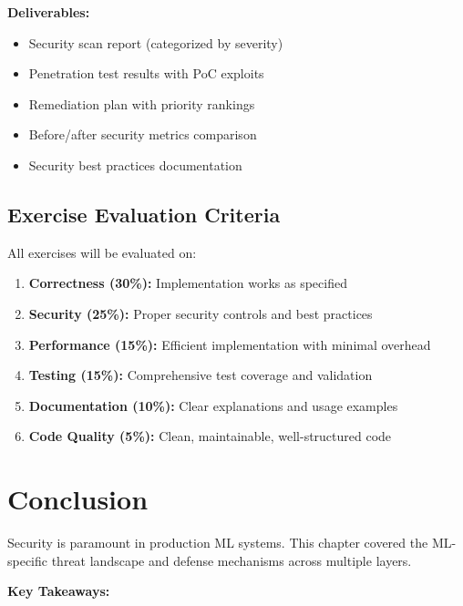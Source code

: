 \textbf{Deliverables:}
\begin{itemize}
    \item Security scan report (categorized by severity)
    \item Penetration test results with PoC exploits
    \item Remediation plan with priority rankings
    \item Before/after security metrics comparison
    \item Security best practices documentation
\end{itemize}

\subsection{Exercise Evaluation Criteria}

All exercises will be evaluated on:

\begin{enumerate}
    \item \textbf{Correctness (30\%):} Implementation works as specified
    \item \textbf{Security (25\%):} Proper security controls and best practices
    \item \textbf{Performance (15\%):} Efficient implementation with minimal overhead
    \item \textbf{Testing (15\%):} Comprehensive test coverage and validation
    \item \textbf{Documentation (10\%):} Clear explanations and usage examples
    \item \textbf{Code Quality (5\%):} Clean, maintainable, well-structured code
\end{enumerate}

\section{Conclusion}

Security is paramount in production ML systems. This chapter covered the ML-specific threat landscape and defense mechanisms across multiple layers.

\textbf{Key Takeaways:}

